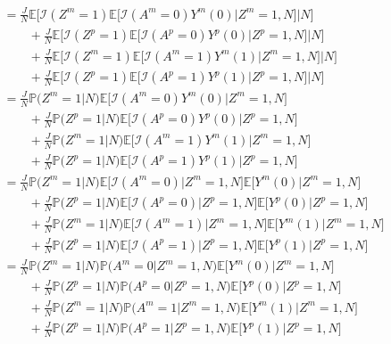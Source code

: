 \documentclass[12pt]{extarticle}
\newcommand{\pp}{\mathbb{P}}
\newcommand{\E}{\mathbb{E}}
\newcommand{\nind}{J}
\newcommand{\indicator}{\mathcal{I}}
\begin{document}
{\begin{align}
\ & = \frac{\nind}{N} \E\Big[\indicator(Z^m=1)\E\big[\indicator(A^m=0)Y^m(0)\big|Z^m=1, N\big]\Big|N \Big] \nonumber \\
\ & \qquad + \frac{\nind}{N} \E\Big[\indicator(Z^p=1)\E\big[\indicator(A^p=0)Y^p(0)\big|Z^p=1, N\big]\Big|N \Big] \nonumber \\
\ & \qquad + \frac{\nind}{N} \E\Big[\indicator(Z^m=1)\E\big[\indicator(A^m=1)Y^m(1)\big|Z^m=1, N\big]\Big|N \Big] \nonumber \\
\ & \qquad + \frac{\nind}{N} \E\Big[\indicator(Z^p=1)\E\big[\indicator(A^p=1)Y^p(1)\big|Z^p=1, N\big]\Big|N \Big] \tag{A4.a} \label{eq:b1} \\
\ & = \frac{\nind}{N} \pp\big(Z^m=1\big|N\big) \E\big[\indicator(A^m=0)Y^m(0)\big|Z^m=1, N\big] \nonumber \\
\ & \qquad + \frac{\nind}{N} \pp\big(Z^p=1\big|N\big) \E\big[\indicator(A^p=0)Y^p(0)\big|Z^p=1,N\big] \nonumber \\
\ & \qquad + \frac{\nind}{N} \pp\big(Z^m=1\big|N\big) \E\big[\indicator(A^m=1)Y^m(1)\big|Z^m=1,N\big] \nonumber \\
\ & \qquad + \frac{\nind}{N} \pp\big(Z^p=1\big|N\big) \E\big[\indicator(A^p=1)Y^p(1)\big|Z^p=1,N\big] \tag{A4.b} \label{eq:b2} \\
\ & = \frac{\nind}{N} \pp\big(Z^m=1\big|N\big) \E\big[\indicator(A^m=0)\big|Z^m=1,N\big] \E\big[Y^m(0)\big|Z^m=1, N\big] \nonumber \\
\ & \qquad + \frac{\nind}{N} \pp\big(Z^p=1\big|N\big) \E\big[\indicator(A^p=0)\big|Z^p=1,N\big]\E\big[Y^p(0)\big|Z^p=1,N\big] \nonumber \\
\ & \qquad + \frac{\nind}{N} \pp\big(Z^m=1\big|N\big) \E\big[\indicator(A^m=1)\big|Z^m=1,N\big]\E\big[Y^m(1)\big|Z^m=1,N\big] \nonumber \\
\ & \qquad + \frac{\nind}{N} \pp\big(Z^p=1\big|N\big) \E\big[\indicator(A^p=1)\big|Z^p=1,N\big]\E\big[Y^p(1)\big|Z^p=1,N\big] \tag{A4.c} \label{eq:b3}\\
\ & = \frac{\nind}{N} \pp\big(Z^m=1\big|N\big) \pp\big(A^m=0\big|Z^m=1,N\big) \E\big[Y^m(0)\big|Z^m=1, N\big] \nonumber \\
\ & \qquad + \frac{\nind}{N} \pp\big(Z^p=1\big|N\big) \pp\big(A^p=0\big|Z^p=1,N\big)\E\big[Y^p(0)\big|Z^p=1,N\big] \nonumber \\
\ & \qquad + \frac{\nind}{N} \pp\big(Z^m=1\big|N\big) \pp\big(A^m=1\big|Z^m=1,N\big)\E\big[Y^m(1)\big|Z^m=1,N\big] \nonumber \\
\ & \qquad + \frac{\nind}{N} \pp\big(Z^p=1\big|N\big) \pp\big(A^p=1\big|Z^p=1,N\big)\E\big[Y^p(1)\big|Z^p=1,N\big] \tag{A4.d} \label{eq:b4}\\

\end{align}}
\end{document}
